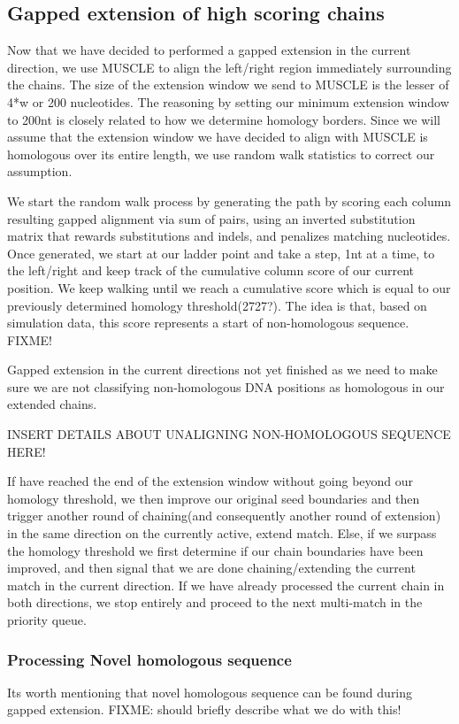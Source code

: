 \documentclass{llncs}
\begin{document}
\subsection{Gapped extension of high scoring chains}

Now that we have decided to performed a gapped extension in the current direction, we use MUSCLE to align the left/right region immediately surrounding the chains. The size of the extension window we send to MUSCLE is the lesser of 4*w or 200 nucleotides. The reasoning by setting our minimum extension window to 200nt is closely related to how we determine homology borders. Since we will assume that the extension window we have decided to align with MUSCLE is homologous over its entire length, we use random walk statistics to correct our assumption.

We start the random walk process by generating the path by scoring each column resulting gapped alignment via sum of pairs, using an inverted substitution matrix that rewards substitutions and indels, and penalizes matching nucleotides. Once generated, we start at our ladder point and take a step, 1nt at a time, to the left/right and keep track of the cumulative column score of our current position. We keep walking until we reach a cumulative score which is equal to our previously determined homology threshold(2727?). The idea is that, based on simulation data, this score represents a start of non-homologous sequence. FIXME!


Gapped extension in the current directions not yet finished as we need to make sure we are not classifying non-homologous DNA positions as homologous in our extended chains.

INSERT DETAILS ABOUT UNALIGNING NON-HOMOLOGOUS SEQUENCE HERE!


If have reached the end of the extension window without going beyond our homology threshold, we then improve our original seed boundaries and then trigger another round of chaining(and consequently another round of extension) in the same direction on the currently active, extend match. Else, if we surpass the homology threshold we first determine if our chain boundaries have been improved, and then signal that we are done chaining/extending the current match in the current direction. If we have already processed the current chain in both directions, we stop entirely and proceed to the next multi-match in the priority queue.

\subsubsection{Processing Novel homologous sequence}
Its worth mentioning that novel homologous sequence can be found during gapped extension.
FIXME: should briefly describe what we do with this!
\end{document}
